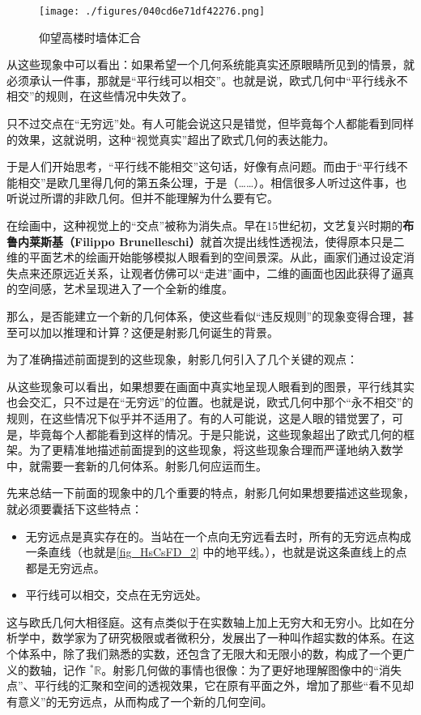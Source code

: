 \begin{figure}[ht]
\centering
\texttt{[image: ./figures/040cd6e71df42276.png]}
\caption{仰望高楼时墙体汇合} \label{fig_HsCsFD_3}
\end{figure}

从这些现象中可以看出：如果希望一个几何系统能真实还原眼睛所见到的情景，就必须承认一件事，那就是“平行线可以相交”。也就是说，欧式几何中“平行线永不相交”的规则，在这些情况中失效了。

只不过交点在“无穷远”处。有人可能会说这只是错觉，但毕竟每个人都能看到同样的效果，这就说明，这种“视觉真实”超出了欧式几何的表达能力。


于是人们开始思考，“平行线不能相交”这句话，好像有点问题。而由于“平行线不能相交”是欧几里得几何的第五条公理，于是（……）。相信很多人听过这件事，也听说过所谓的非欧几何。但并不能理解为什么要有它。


在绘画中，这种视觉上的“交点”被称为消失点。早在15世纪初，文艺复兴时期的\textbf{布鲁内莱斯基（Filippo Brunelleschi）}就首次提出线性透视法，使得原本只是二维的平面艺术的绘画开始能够模拟人眼看到的空间景深。从此，画家们通过设定消失点来还原远近关系，让观者仿佛可以“走进”画中，二维的画面也因此获得了逼真的空间感，艺术呈现进入了一个全新的维度。



那么，是否能建立一个新的几何体系，使这些看似“违反规则”的现象变得合理，甚至可以加以推理和计算？这便是射影几何诞生的背景。

为了准确描述前面提到的这些现象，射影几何引入了几个关键的观点：

从这些现象可以看出，如果想要在画面中真实地呈现人眼看到的图景，平行线其实也会交汇，只不过是在“无穷远”的位置。也就是说，欧式几何中那个“永不相交”的规则，在这些情况下似乎并不适用了。有的人可能说，这是人眼的错觉罢了，可是，毕竟每个人都能看到这样的情况。于是只能说，这些现象超出了欧式几何的框架。为了更精准地描述前面提到的这些现象，将这些现象合理而严谨地纳入数学中，就需要一套新的几何体系。射影几何应运而生。

先来总结一下前面的现象中的几个重要的特点，射影几何如果想要描述这些现象，就必须要囊括下这些特点：
\begin{itemize}
\item 无穷远点是真实存在的。当站在一个点向无穷远看去时，所有的无穷远点构成一条直线（也就是\autoref{fig_HsCsFD_2} 中的地平线。），也就是说这条直线上的点都是无穷远点。
\item 平行线可以相交，交点在无穷远处。
\end{itemize}

这与欧氏几何大相径庭。这有点类似于在实数轴上加上无穷大和无穷小。比如在分析学中，数学家为了研究极限或者微积分，发展出了一种叫作超实数的体系。在这个体系中，除了我们熟悉的实数，还包含了无限大和无限小的数，构成了一个更广义的数轴，记作 $^*\mathbb{R}$。射影几何做的事情也很像：为了更好地理解图像中的“消失点”、平行线的汇聚和空间的透视效果，它在原有平面之外，增加了那些“看不见却有意义”的无穷远点，从而构成了一个新的几何空间。


